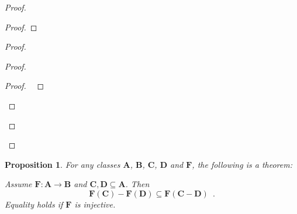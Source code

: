 \documentclass{book}
\let\qed\relax
\newtheorem{prop}[ax]{Proposition}
\theoremstyle{definition}
\begin{document}
\begin{proof}
\pf
{}
\begin{proof}
\end{proof}
\begin{proof}
	\begin{proof}
		\begin{proof}
			\pf\ 
		\end{proof}
	\end{proof}
\end{proof}
\qed
\end{proof}

\begin{prop}
\label{prop:imgdiff}
For any classes $\mathbf{A}$, $\mathbf{B}$, $\mathbf{C}$, $\mathbf{D}$ and $\mathbf{F}$, the following is a theorem:

Assume $\mathbf{F} : \mathbf{A} \rightarrow \mathbf{B}$ and $\mathbf{C}, \mathbf{D} \subseteq \mathbf{A}$. Then
\[ \mathbf{F}(\mathbf{C}) - \mathbf{F}(\mathbf{D}) \subseteq \mathbf{F}(\mathbf{C} - \mathbf{D}) \enspace . \]
Equality holds if $\mathbf{F}$ is injective.
\end{prop}
\end{document}
